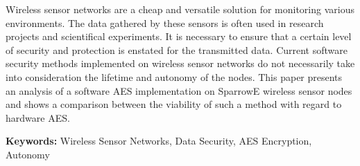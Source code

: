 Wireless sensor networks are a cheap and versatile solution for monitoring various environments.
The data gathered by these sensors is often used in research projects and scientifical experiments.
It is necessary to ensure that a certain level of security and protection is enstated for the transmitted 
data. Current software security methods implemented on wireless sensor networks do not necessarily take 
into consideration the lifetime and autonomy of the nodes. This paper presents an analysis of a software 
AES implementation on SparrowE wireless sensor nodes and shows a comparison between the viability of such a 
method with regard to hardware AES.

\textbf{Keywords:} Wireless Sensor Networks, Data Security, AES Encryption, Autonomy
